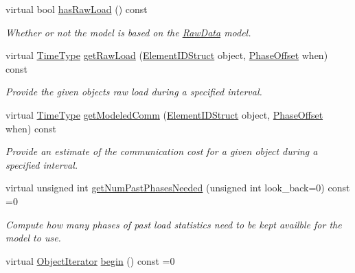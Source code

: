 \begin{DoxyCompactItemize}
virtual bool \hyperlink{structvt_1_1vrt_1_1collection_1_1balance_1_1_load_model_a626f65c651ea15f4a40b9f058778c620}{has\+Raw\+Load} () const
\begin{DoxyCompactList}\small\item\em Whether or not the model is based on the \hyperlink{structvt_1_1vrt_1_1collection_1_1balance_1_1_raw_data}{Raw\+Data} model. \end{DoxyCompactList}\item 
virtual \hyperlink{namespacevt_a876a9d0cd5a952859c72de8a46881442}{Time\+Type} \hyperlink{structvt_1_1vrt_1_1collection_1_1balance_1_1_load_model_ad8a47fa5f0ca872055e7216061e84884}{get\+Raw\+Load} (\hyperlink{namespacevt_1_1vrt_1_1collection_1_1balance_a9f5b53fafb270212279a4757d2c4cd28}{Element\+I\+D\+Struct} object, \hyperlink{structvt_1_1vrt_1_1collection_1_1balance_1_1_phase_offset}{Phase\+Offset} when) const
\begin{DoxyCompactList}\small\item\em Provide the given object\textquotesingle{}s raw load during a specified interval. \end{DoxyCompactList}\item 
virtual \hyperlink{namespacevt_a876a9d0cd5a952859c72de8a46881442}{Time\+Type} \hyperlink{structvt_1_1vrt_1_1collection_1_1balance_1_1_load_model_a1143c5dda0d3e409db174d5de6bfceb5}{get\+Modeled\+Comm} (\hyperlink{namespacevt_1_1vrt_1_1collection_1_1balance_a9f5b53fafb270212279a4757d2c4cd28}{Element\+I\+D\+Struct} object, \hyperlink{structvt_1_1vrt_1_1collection_1_1balance_1_1_phase_offset}{Phase\+Offset} when) const
\begin{DoxyCompactList}\small\item\em Provide an estimate of the communication cost for a given object during a specified interval. \end{DoxyCompactList}\item 
virtual unsigned int \hyperlink{structvt_1_1vrt_1_1collection_1_1balance_1_1_load_model_a44905eb3e15e7f22b2f8d1fe7297cea0}{get\+Num\+Past\+Phases\+Needed} (unsigned int look\+\_\+back=0) const =0
\begin{DoxyCompactList}\small\item\em Compute how many phases of past load statistics need to be kept availble for the model to use. \end{DoxyCompactList}\item 
virtual \hyperlink{structvt_1_1vrt_1_1collection_1_1balance_1_1_object_iterator}{Object\+Iterator} \hyperlink{structvt_1_1vrt_1_1collection_1_1balance_1_1_load_model_a085a13e3cfeff2beb88b49ddaed4ef8d}{begin} () const =0

\end{DoxyCompactItemize}
